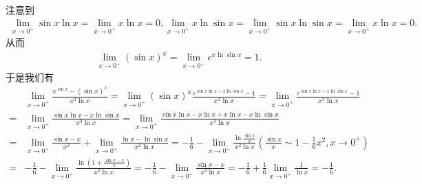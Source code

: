 \documentclass[../../main.tex]{subfiles}%
\begin{document}
\begin{solution}
注意到\begin{align*}
\lim_{x\rightarrow0^{+}}\sin x\ln x=\lim_{x\rightarrow0^{+}}x\ln x = 0, \lim_{x\rightarrow0^{+}}x\ln\sin x=\lim_{x\rightarrow0^{+}}\sin x\ln\sin x=\lim_{x\rightarrow0^{+}}x\ln x = 0.
\end{align*}
从而
\begin{align*}
\lim_{x\rightarrow 0^+} (\sin x)^x=\lim_{x\rightarrow 0^+} e^{x\ln\sin x}=1.
\end{align*}
于是我们有
\begin{align*}
&\lim_{x\rightarrow0^{+}}\frac{x^{\sin x}-(\sin x)^{x}}{x^{3}\ln x}=\lim_{x\rightarrow0^{+}}(\sin x)^{x}\frac{e^{\sin x\ln x - x\ln\sin x}-1}{x^{3}\ln x}=\lim_{x\rightarrow0^{+}}\frac{e^{\sin x\ln x - x\ln\sin x}-1}{x^{3}\ln x}\\
=&\lim_{x\rightarrow0^{+}}\frac{\sin x\ln x - x\ln\sin x}{x^{3}\ln x}=\lim_{x\rightarrow0^{+}}\frac{\sin x\ln x - x\ln x + x\ln x - x\ln\sin x}{x^{3}\ln x}\\
=&\lim_{x\rightarrow0^{+}}\frac{\sin x - x}{x^{3}}+\lim_{x\rightarrow0^{+}}\frac{\ln x - \ln\sin x}{x^{2}\ln x}=-\frac{1}{6}-\lim_{x\rightarrow0^{+}}\frac{\ln\frac{\sin x}{x}}{x^{2}\ln x}(\frac{\sin x}{x}\sim1 - \frac{1}{6}x^{2},x\to 0^+)\\
=&-\frac{1}{6}-\lim_{x\rightarrow0^{+}}\frac{\ln(1 + \frac{\sin x - x}{x})}{x^{2}\ln x}=-\frac{1}{6}-\lim_{x\rightarrow0^{+}}\frac{\sin x - x}{x^{3}\ln x}=-\frac{1}{6}+\frac{1}{6}\lim_{x\rightarrow0^{+}}\frac{1}{\ln x}=-\frac{1}{6}.
\end{align*}

\end{solution}
\end{document}
